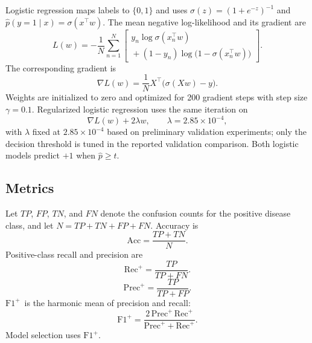 \documentclass[10pt,conference,compsocconf]{IEEEtran}
\newcommand{\Fp}{\ensuremath{\mathrm{F1}^{+}}}
\begin{document}
Logistic regression maps labels to $\{0,1\}$ and uses
$\sigma(z)=(1+e^{-z})^{-1}$ and $\hat p(y=1\mid x)=\sigma(x^\top w)$.
The mean negative log-likelihood and its gradient are
\begin{equation}
L(w)=-\frac{1}{N}\sum_{n=1}^{N}\left[
\begin{aligned}
y_n\log\sigma(x_n^\top w)\\
{}+(1-y_n)\log\big(1-\sigma(x_n^\top w)\big)
\end{aligned}
\right].
\label{eq:nll}
\end{equation}
The corresponding gradient is
\begin{equation}
\nabla L(w)=\frac{1}{N}X^\top\big(\sigma(Xw)-y\big).
\label{eq:nll_gradient}
\end{equation}
Weights are initialized to zero and optimized for 200 gradient steps with step size $\gamma=0.1$.
Regularized logistic regression uses the same iteration on
\begin{equation}
\nabla L(w)+2\lambda w,
\qquad
\lambda=2.85\times 10^{-4},
\label{eq:reglog}
\end{equation}
with $\lambda$ fixed at $2.85\times10^{-4}$ based on preliminary validation experiments; only the decision threshold is tuned in the reported validation comparison.
Both logistic models predict $+1$ when $\hat p\ge t$.

\subsection{Metrics}
Let $TP$, $FP$, $TN$, and $FN$ denote the confusion counts for the positive disease class, and let $N=TP+TN+FP+FN$. Accuracy is
\begin{equation}
\mathrm{Acc}=\frac{TP+TN}{N}.
\label{eq:accuracy}
\end{equation}
Positive-class recall and precision are
\begin{equation}
\mathrm{Rec}^{+}=\frac{TP}{TP+FN}.
\label{eq:recall}
\end{equation}
\begin{equation}
\mathrm{Prec}^{+}=\frac{TP}{TP+FP}.
\label{eq:precision}
\end{equation}
\Fp\ is the harmonic mean of precision and recall:
\begin{equation}
\Fp=\frac{2\,\mathrm{Prec}^{+}\,\mathrm{Rec}^{+}}{\mathrm{Prec}^{+}+\mathrm{Rec}^{+}}.
\label{eq:f1}
\end{equation}
Model selection uses \Fp.
\end{document}
